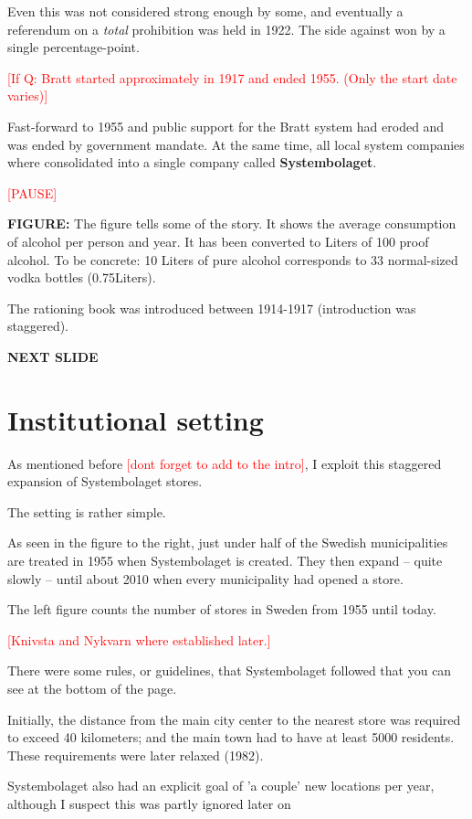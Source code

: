 \documentclass[12pt]{article}
\newcommand{\TODO}[1]{\textcolor{red}{[#1]}}
\begin{document}
Even this was not considered strong enough by some, and eventually a referendum on a \emph{total}  prohibition was held in 1922. The side against won by a single percentage-point.

\TODO{If Q: Bratt started approximately in 1917 and ended 1955. (Only the start date varies)}

Fast-forward to 1955 and public support for the Bratt system had eroded and was ended by government mandate. At the same time, all local system companies where consolidated into a single company called  \textbf{Systembolaget}.

\TODO{PAUSE}

 \textbf{FIGURE:} The figure tells some of the story. It shows the average consumption of alcohol per person and year. It has been converted to Liters of 100 proof alcohol. To be concrete: 10 Liters of pure alcohol corresponds to 33 normal-sized vodka bottles (0.75Liters).

The rationing book was introduced between 1914-1917 (introduction was staggered).

\textbf{NEXT SLIDE}

\section{Institutional setting}

 As mentioned before \TODO{dont forget to add to the intro}, I exploit this staggered expansion of Systembolaget stores. 
 
 The setting is rather simple. 

 As seen in the figure to the right, just under half of the Swedish municipalities are treated in 1955 when Systembolaget is created. They then expand -- quite slowly -- until about 2010 when every municipality had opened a store. 
 
 The left figure counts the number of stores in Sweden from 1955 until today.

 \TODO{Knivsta and Nykvarn where established later.}

 There were some rules, or guidelines, that Systembolaget followed that you can see at the bottom of the page.

 Initially, the distance from the main city center to the nearest store was required to exceed 40 kilometers; and the main town had to have at least 5000 residents. These requirements were later relaxed (1982).

 Systembolaget also had an explicit goal of 'a couple' new locations per year, although I suspect this was partly ignored later on
 
\end{document}
